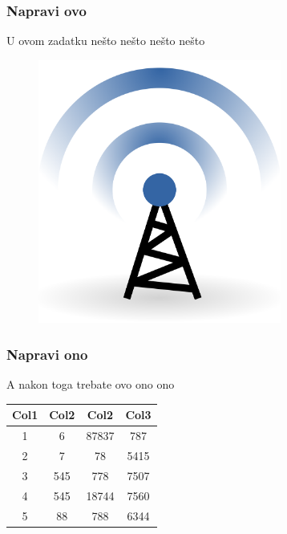 \documentclass[class=article, crop=false]{standalone}
\begin{document}
	
	
	\subsubsection{Napravi ovo}
	
	U ovom zadatku nešto nešto nešto nešto
	
	
	\begin{figure}[h]
		\centering
		\includegraphics[width=8cm]{antena}
	\end{figure}
	
	
	\subsubsection{Napravi ono}
	
	A nakon toga trebate ovo ono ono
	
	
	\begin{center}
		\begin{tabular}{||c c c c||} 
			\hline
			Col1 & Col2 & Col2 & Col3 \\ [0.5ex] 
			\hline\hline
			1 & 6 & 87837 & 787 \\ 
			\hline
			2 & 7 & 78 & 5415 \\
			\hline
			3 & 545 & 778 & 7507 \\
			\hline
			4 & 545 & 18744 & 7560 \\
			\hline
			5 & 88 & 788 & 6344 \\ [1ex] 
			\hline
		\end{tabular}
	\end{center}
	
	
	
\end{document}
